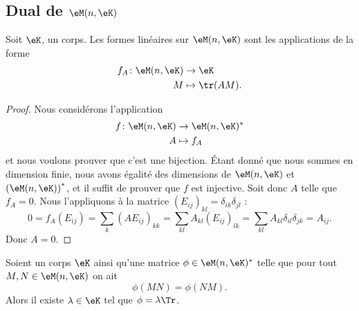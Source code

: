 \subsection{Dual de \texorpdfstring{$ \eM(n,\eK)$}{M(n,K)}}

\begin{proposition}     \label{PropHOjJpCa}
    Soit \( \eK\), un corps. Les formes linéaires sur \( \eM(n,\eK)\) sont les applications de la forme
    \begin{equation}
        \begin{aligned}
            f_A\colon \eM(n,\eK)&\to \eK \\
            M&\mapsto \tr(AM).
        \end{aligned}
    \end{equation}
\end{proposition}


\begin{proof}
    Nous considérons l'application
    \begin{equation}
        \begin{aligned}
            f\colon \eM(n,\eK)&\to \eM(n,\eK)^* \\
            A&\mapsto f_A
        \end{aligned}
    \end{equation}
    et nous voulons prouver que c'est une bijection. Étant donné que nous sommes en dimension finie, nous avons égalité des dimensions de \( \eM(n,\eK)\) et \( \left(\eM(n,\eK)\right)^*\), et il suffit de prouver que \( f\) est injective. Soit donc \( A\) telle que \( f_A=0\). Nous l'appliquons à la matrice \( (E_{ij})_{kl}=\delta_{ik}\delta_{jl}\) :
    \begin{equation}
            0=f_A(E_{ij})
            =\sum_{k}(AE_{ij})_{kk}
            =\sum_{kl}A_{kl}(E_{ij})_{lk}
            =\sum_{kl}A_{kl}\delta_{il}\delta_{jk}
            =A_{ij}.
    \end{equation}
    Donc \( A=0\).
\end{proof}

\begin{corollary}
    Soient un corps \( \eK\) ainsi qu'une matrice \( \phi\in\eM(n,\eK)^*\) telle que pour tout \( M,N\in \eM(n,\eK)\) on ait
    \begin{equation}
        \phi(MN)=\phi(NM).
    \end{equation}
    Alors il existe \( \lambda\in \eK\) tel que \( \phi=\lambda\Tr\).
\end{corollary}

